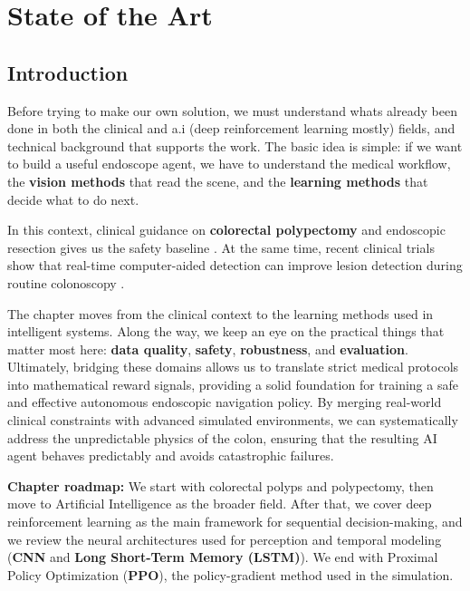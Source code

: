 \chapter{State of the Art}
\label{chap:state_of_the_art}

\section*{Introduction}
Before trying to make our own solution, we must understand whats already been done in both the clinical and a.i (deep reinforcement learning mostly) fields, and technical background that supports the
work. The basic idea is simple: if we want to build a useful endoscope agent, we have
to understand the medical workflow, the \textbf{vision methods} that read the scene, and the
\textbf{learning methods} that decide what to do next.

In this context, clinical guidance on \textbf{colorectal polypectomy} and endoscopic resection
gives us the safety baseline \cite{ferlitsch2017esge,kaltenbach2020usmstf}. At the same
time, recent clinical trials show that real-time computer-aided detection can improve
lesion detection during routine colonoscopy \cite{wang2019cade,repici2020cade}.

The chapter moves from the clinical context to the learning methods used in intelligent
systems. Along the way, we keep an eye on the practical things that matter most here:
\textbf{data quality}, \textbf{safety}, \textbf{robustness}, and \textbf{evaluation}. Ultimately, bridging these domains allows us to translate strict medical protocols into mathematical reward signals, providing a solid foundation for training a safe and effective autonomous endoscopic navigation policy. By merging real-world clinical constraints with advanced simulated environments, we can systematically address the unpredictable physics of the colon, ensuring that the resulting AI agent behaves predictably and avoids catastrophic failures.

\textbf{Chapter roadmap:} We start with colorectal polyps and polypectomy, then move to
Artificial Intelligence as the broader field. After that, we cover deep reinforcement learning
as the main framework for sequential decision-making, and we review the neural
architectures used for perception and temporal modeling (\textbf{CNN} and \textbf{Long Short-Term Memory (LSTM)}). We end with
Proximal Policy Optimization (\textbf{PPO}), the policy-gradient method used in the simulation.

